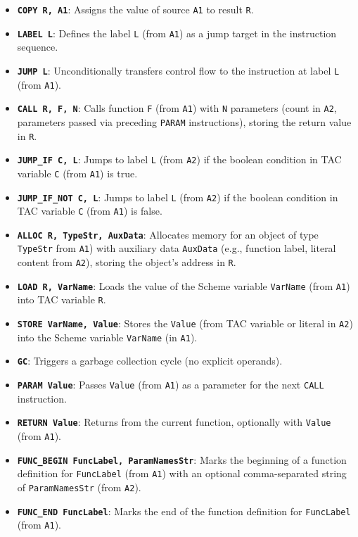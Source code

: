 \documentclass[final]{cmpreport_02}
\begin{document}
\begin{itemize}[itemsep=3pt]
    \item \textbf{\texttt{COPY R, A1}}: Assigns the value of source \texttt{A1} to result \texttt{R}.
    \item \textbf{\texttt{LABEL L}}: Defines the label \texttt{L} (from \texttt{A1}) as a jump target in the instruction sequence.
    \item \textbf{\texttt{JUMP L}}: Unconditionally transfers control flow to the instruction at label \texttt{L} (from \texttt{A1}).
    \item \textbf{\texttt{CALL R, F, N}}: Calls function \texttt{F} (from \texttt{A1}) with \texttt{N} parameters (count in \texttt{A2}, parameters passed via preceding \texttt{PARAM} instructions), storing the return value in \texttt{R}.
    \item \textbf{\texttt{JUMP\_IF C, L}}: Jumps to label \texttt{L} (from \texttt{A2}) if the boolean condition in TAC variable \texttt{C} (from \texttt{A1}) is true.
    \item \textbf{\texttt{JUMP\_IF\_NOT C, L}}: Jumps to label \texttt{L} (from \texttt{A2}) if the boolean condition in TAC variable \texttt{C} (from \texttt{A1}) is false.
    \item \textbf{\texttt{ALLOC R, TypeStr, AuxData}}: Allocates memory for an object of type \texttt{TypeStr} from \texttt{A1}) with auxiliary data \texttt{AuxData} (e.g., function label, literal content from \texttt{A2}), storing the object's address in \texttt{R}.
    \item \textbf{\texttt{LOAD R, VarName}}: Loads the value of the Scheme variable \texttt{VarName} (from \texttt{A1}) into TAC variable \texttt{R}.
    \item \textbf{\texttt{STORE VarName, Value}}: Stores the \texttt{Value} (from TAC variable or literal in \texttt{A2}) into the Scheme variable \texttt{VarName} (in \texttt{A1}).
    \item \textbf{\texttt{GC}}: Triggers a garbage collection cycle (no explicit operands).
    \item \textbf{\texttt{PARAM Value}}: Passes \texttt{Value} (from \texttt{A1}) as a parameter for the next \texttt{CALL} instruction.
    \item \textbf{\texttt{RETURN Value}}: Returns from the current function, optionally with \texttt{Value} (from \texttt{A1}).
    \item \textbf{\texttt{FUNC\_BEGIN FuncLabel, ParamNamesStr}}: Marks the beginning of a function definition for \texttt{FuncLabel} (from \texttt{A1}) with an optional comma-separated string of \texttt{ParamNamesStr} (from \texttt{A2}).
    \item \textbf{\texttt{FUNC\_END FuncLabel}}: Marks the end of the function definition for \texttt{FuncLabel} (from \texttt{A1}).
\end{itemize}
\end{document}
